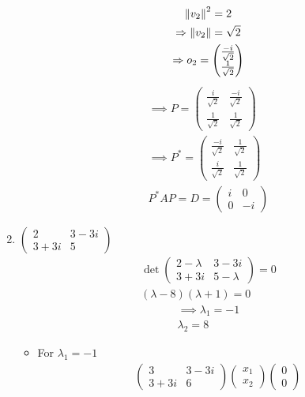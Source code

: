 \begin{enumerate}
\begin{gather}
\left\lVert v_2\right\rVert^2 = 2\\
\Rightarrow \left\lVert v_2\right\rVert = \sqrt{2}\\
\Rightarrow o_2 = \begin{pmatrix}\frac{-i}{\sqrt{2}}\\\frac{1}{\sqrt{2}}
\end{pmatrix}
\end{gather}
\begin{gather}
\implies P = \begin{pmatrix}
\frac{i}{\sqrt{2}} & \frac{-i}{\sqrt{2}}\\
\frac{1}{\sqrt{2}} & \frac{1}{\sqrt{2}}
\end{pmatrix}\\
\implies P^* = \begin{pmatrix}
\frac{-i}{\sqrt{2}} & \frac{1}{\sqrt{2}}\\
\frac{i}{\sqrt{2}} & \frac{1}{\sqrt{2}}
\end{pmatrix}\\
P^*AP = D = \begin{pmatrix}
i & 0\\
0 & -i
\end{pmatrix}
\end{gather}
\item $\begin{pmatrix}
2 & 3-3i\\
3+3i & 5
\end{pmatrix}$
\begin{gather}
\det{
\begin{pmatrix}
2-\lambda & 3-3i\\
3+3i & 5-\lambda
\end{pmatrix}
}=0\\
(\lambda -8)(\lambda+1) = 0
\end{gather}
\begin{align}
\implies \lambda_1 = -1\\
\lambda_2 = 8
\end{align}
\begin{itemize}
\item For $\lambda_1 = -1$
\begin{gather}
\begin{pmatrix}
3 & 3-3i\\
3+3i & 6
\end{pmatrix}
\begin{pmatrix}
x_1 \\x_2
\end{pmatrix}
\begin{pmatrix}
0\\0

\end{pmatrix}
\end{gather}
\end{itemize}
\end{enumerate}

